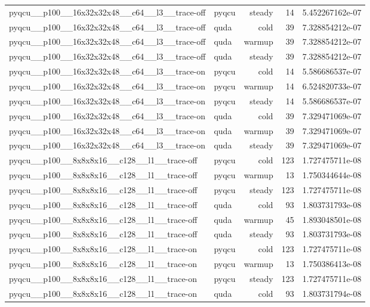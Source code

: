 \begin{table}[htbp]
\begin{tabular}{@{}llrrr@{}}
pyqcu\_\_p100\_\_16x32x32x48\_\_c64\_\_l3\_\_trace-off & pyqcu & steady & 14 & 5.452267162e-07 \\
pyqcu\_\_p100\_\_16x32x32x48\_\_c64\_\_l3\_\_trace-off & quda & cold & 39 & 7.328854212e-07 \\
pyqcu\_\_p100\_\_16x32x32x48\_\_c64\_\_l3\_\_trace-off & quda & warmup & 39 & 7.328854212e-07 \\
pyqcu\_\_p100\_\_16x32x32x48\_\_c64\_\_l3\_\_trace-off & quda & steady & 39 & 7.328854212e-07 \\
pyqcu\_\_p100\_\_16x32x32x48\_\_c64\_\_l3\_\_trace-on & pyqcu & cold & 14 & 5.586686537e-07 \\
pyqcu\_\_p100\_\_16x32x32x48\_\_c64\_\_l3\_\_trace-on & pyqcu & warmup & 14 & 6.524820733e-07 \\
pyqcu\_\_p100\_\_16x32x32x48\_\_c64\_\_l3\_\_trace-on & pyqcu & steady & 14 & 5.586686537e-07 \\
pyqcu\_\_p100\_\_16x32x32x48\_\_c64\_\_l3\_\_trace-on & quda & cold & 39 & 7.329471069e-07 \\
pyqcu\_\_p100\_\_16x32x32x48\_\_c64\_\_l3\_\_trace-on & quda & warmup & 39 & 7.329471069e-07 \\
pyqcu\_\_p100\_\_16x32x32x48\_\_c64\_\_l3\_\_trace-on & quda & steady & 39 & 7.329471069e-07 \\
pyqcu\_\_p100\_\_8x8x8x16\_\_c128\_\_l1\_\_trace-off & pyqcu & cold & 123 & 1.727475711e-08 \\
pyqcu\_\_p100\_\_8x8x8x16\_\_c128\_\_l1\_\_trace-off & pyqcu & warmup & 13 & 1.750344644e-08 \\
pyqcu\_\_p100\_\_8x8x8x16\_\_c128\_\_l1\_\_trace-off & pyqcu & steady & 123 & 1.727475711e-08 \\
pyqcu\_\_p100\_\_8x8x8x16\_\_c128\_\_l1\_\_trace-off & quda & cold & 93 & 1.803731793e-08 \\
pyqcu\_\_p100\_\_8x8x8x16\_\_c128\_\_l1\_\_trace-off & quda & warmup & 45 & 1.893048501e-08 \\
pyqcu\_\_p100\_\_8x8x8x16\_\_c128\_\_l1\_\_trace-off & quda & steady & 93 & 1.803731793e-08 \\
pyqcu\_\_p100\_\_8x8x8x16\_\_c128\_\_l1\_\_trace-on & pyqcu & cold & 123 & 1.727475711e-08 \\
pyqcu\_\_p100\_\_8x8x8x16\_\_c128\_\_l1\_\_trace-on & pyqcu & warmup & 13 & 1.750386413e-08 \\
pyqcu\_\_p100\_\_8x8x8x16\_\_c128\_\_l1\_\_trace-on & pyqcu & steady & 123 & 1.727475711e-08 \\
pyqcu\_\_p100\_\_8x8x8x16\_\_c128\_\_l1\_\_trace-on & quda & cold & 93 & 1.803731794e-08 \\

\end{tabular}
\end{table}
